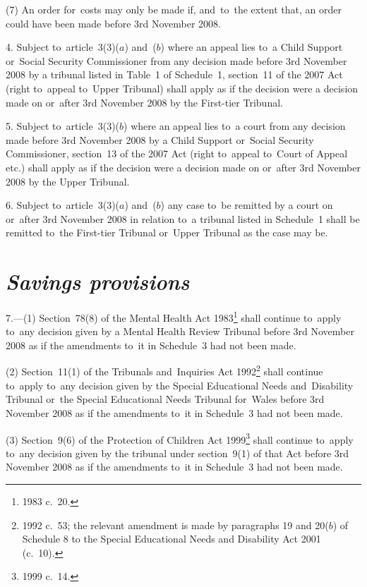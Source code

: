 \documentclass[12pt,a4paper]{article}
\begin{document}
(7) An order for~costs may only be made if, and~to~the extent that, an order could have been made before 3rd November 2008.

\medskip

4.  Subject to~article~3(3)($a$)  and~($b$)  where an appeal lies to~a Child Support or~Social Security Commissioner from any decision made before 3rd November 2008 by a tribunal listed in Table~1 of Schedule~1, section~11 of the 2007 Act (right to~appeal to~Upper Tribunal) shall apply as if the decision were a decision made on or~after 3rd November 2008 by the First-tier Tribunal.

\medskip

5.  Subject to~article~3(3)($b$)  where an appeal lies to~a court from any decision made before 3rd November 2008 by a Child Support or~Social Security Commissioner, section~13 of the 2007 Act (right to~appeal to~Court of Appeal etc.) shall apply as if the decision were a decision made on or~after 3rd November 2008 by the Upper Tribunal.

\medskip

6.  Subject to~article~3(3)($a$)  and~($b$)  any case to~be remitted by a court on or~after 3rd November 2008 in relation to~a tribunal listed in Schedule~1 shall be remitted to~the First-tier Tribunal or~Upper Tribunal as the case may be.

\section*{\itshape Savings provisions}

7.---(1)  Section~78(8) of the Mental Health Act 1983\footnote{1983 c.~20.} shall continue to~apply to~any decision given by a Mental Health Review Tribunal before 3rd November 2008 as if the amendments to~it in Schedule~3 had not been made.

(2) Section~11(1) of the Tribunals and~Inquiries Act 1992\footnote{1992 c.~53; the relevant amendment is made by paragraphs 19 and 20($b$) of Schedule 8 to the Special Educational Needs and Disability Act 2001 (c.~10).} shall continue to~apply to~any decision given by the Special Educational Needs and~Disability Tribunal or~the Special Educational Needs Tribunal for~Wales before 3rd November 2008 as if the amendments to~it in Schedule~3 had not been made.

(3) Section~9(6) of the Protection of Children Act 1999\footnote{1999 c.~14.} shall continue to~apply to~any decision given by the tribunal under section~9(1) of that Act before 3rd November 2008 as if the amendments to~it in Schedule~3 had not been made. 
\end{document}
